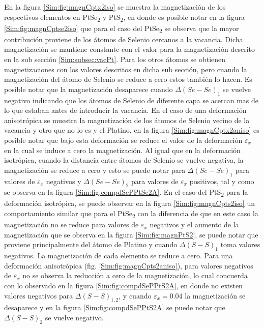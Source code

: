 \par En la figura \ref{Sim:fig:magnCptx2iso} se muestra la magnetizaci\'on de los respectivos elementos en PtSe\textsubscript{2} y  PtS\textsubscript{2}, en donde es posible notar en la figura \ref{Sim:fig:magnCptse2iso} que para el caso del PtSe\textsubscript{2} se observa que la mayor contribución proviene de los átomos de Selenio cercanos a la vacancia. Dicha magnetización se mantiene constante con el valor para la magnetización descrito en la sub sección \ref{Sim:subsec:vacPt}. Para  los otros \'atomos se obtienen magnetizaciones con los valores descritos en dicha sub secci\'on,  pero cuando la magnetizaci\'on del \'atomo de Selenio se reduce a cero estos tambi\'en lo hacen. Es posible notar que la magnetizaci\'on  desaparece cuando $\Delta (Se-Se)_{1}$ se vuelve negativo indicando que los \'atomos de Selenio de diferente capa se acercan mas de lo que estaban antes de introducir la vacancia. En el caso de una deformaci\'on anisotr\'opica se muestra la magnetizaci\'on de los \'atomos de Selenio vecino de la vacancia y otro que no lo es y  el Platino, en la figura \ref{Sim:fig:magnCptx2aniso} es posible notar que bajo esta deformaci\'on se reduce el valor de la deformaci\'on $\varepsilon_x$ en la cual se induce a cero la magnetizaci\'on.  Al igual que en la deformaci\'on isotr\'opica, cuando la distancia entre \'atomos de Selenio se vuelve negativa, la magnetizaci\'on se reduce a cero y esto se puede notar para $\Delta (Se-Se)_1$ para valores de $\varepsilon_x$ negativos y $\Delta (Se-Se)_2$ para valores de $\varepsilon_x$ positivos, tal y como se observa en la figura \ref{Sim:fig:compdSePPtSe2A}. En el caso del PtS\textsubscript{2} para la deformación isotrópica, se puede observar en la figura \ref{Sim:fig:magnCpts2iso} un comportamiento similar que para el PtSe\textsubscript{2} con la diferencia de que en este caso la magnetización no se reduce para valores de $\varepsilon_x$ negativos y el aumento de la magnetizaci\'on que se observa en la figura \ref{Sim:fig:magnPtS2},  se puede notar que proviene  principalmente del \'atomo de Platino  y cuando $\Delta (S-S)_1$ toma valores negativos. La magnetizaci\'on de cada elemento se reduce a cero. Para una deformaci\'on anisotr\'opica (fig. \ref{Sim:fig:magnCpts2aniso}),  para valores negativos de $\varepsilon_x$ no se observa la reducci\'on a cero de la magnetizaci\'on, lo cual concuerda con lo observado en la figura \ref{Sim:fig:compdSePPtS2A}, en donde no existen valores negativos para $\Delta (S-S)_{1,2}$, y cuando  $\varepsilon_x=0.04$ la magnetización se desaparece y en la figura \ref{Sim:fig:compdSePPtS2A} se puede notar que $\Delta (S-S)_2$ se vuelve negativo.

